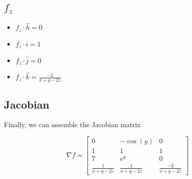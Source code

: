 \documentclass[letterpaper]{article}
\begin{document}
\subsection{\(f_z\)}
\label{sec:org0be4cd8}
\begin{itemize}
\item \(f_z \cdot {\hat{h}} = 0\)
\item \(f_z \cdot {\hat{i}} = 1\)
\item \(f_z \cdot {\hat{j}} = 0\)
\item \(f_z \cdot {\hat{k}} = \frac{-2}{x+y-2z}\)
\end{itemize}

\subsection{Jacobian}
\label{sec:org6c6f6e9}
Finally, we can assemble the Jacobian matrix

\begin{equation}
   \nabla f = \begin{bmatrix} 
0 & -\cos(y) & 0  \\
1 & 1 & 1 \\
7 & e^y & 0 \\
\frac{1}{x+y-2z} & \frac{1}{x+y-2z} & \frac{-2}{x+y-2z}
   \end{bmatrix} 
\end{equation}
\end{document}
